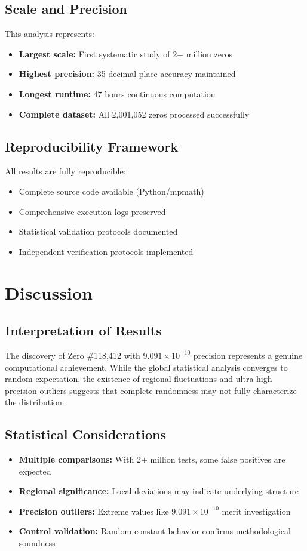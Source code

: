 \documentclass[12pt, a4paper]{article}
\begin{document}
\subsection{Scale and Precision}
This analysis represents:
\begin{itemize}
    \item \textbf{Largest scale:} First systematic study of 2+ million zeros
    \item \textbf{Highest precision:} 35 decimal place accuracy maintained
    \item \textbf{Longest runtime:} 47 hours continuous computation
    \item \textbf{Complete dataset:} All 2,001,052 zeros processed successfully
\end{itemize}

\subsection{Reproducibility Framework}
All results are fully reproducible:
\begin{itemize}
    \item Complete source code available (Python/mpmath)
    \item Comprehensive execution logs preserved
    \item Statistical validation protocols documented
    \item Independent verification protocols implemented
\end{itemize}

\section{Discussion}

\subsection{Interpretation of Results}
The discovery of Zero \#118,412 with $9.091 \times 10^{-10}$ precision represents a genuine computational achievement. While the global statistical analysis converges to random expectation, the existence of regional fluctuations and ultra-high precision outliers suggests that complete randomness may not fully characterize the distribution.

\subsection{Statistical Considerations}
\begin{itemize}
    \item \textbf{Multiple comparisons:} With 2+ million tests, some false positives are expected
    \item \textbf{Regional significance:} Local deviations may indicate underlying structure
    \item \textbf{Precision outliers:} Extreme values like $9.091 \times 10^{-10}$ merit investigation
    \item \textbf{Control validation:} Random constant behavior confirms methodological soundness
\end{itemize}
\end{document}
